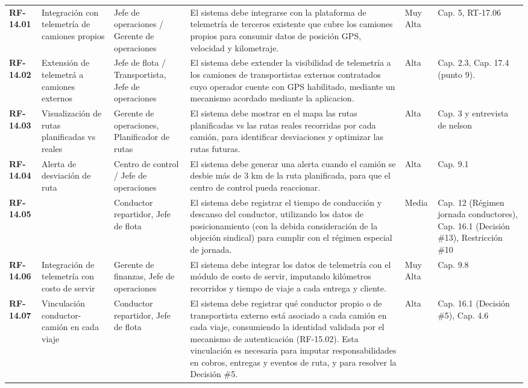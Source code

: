 \begin{longtable}{p{1.7cm} p{2.3cm} p{1.9cm} p{5.0cm} p{1.1cm} p{1.9cm}}
\textbf{RF-14.01} & Integración con telemetría de camiones propios & Jefe de operaciones / Gerente de operaciones & El sistema debe integrarse con la plataforma de telemetría de terceros existente que cubre los camiones propios para consumir datos de posición GPS, velocidad y kilometraje. & Muy Alta & Cap. 5, RT-17.06 \\
\textbf{RF-14.02} & Extensión de telemetrá a camiones externos & Jefe de flota / Transportista, Jefe de operaciones & El sistema debe extender la visibilidad de telemetría a los camiones de transportistas externos contratados cuyo operador cuente con GPS habilitado, mediante un mecanismo acordado mediante la aplicacion. & Alta & Cap. 2.3, Cap. 17.4 (punto 9). \\
\textbf{RF-14.03} & Visualización de rutas planificadas vs reales & Gerente de operaciones, Planificador de rutas & El sistema debe mostrar en el mapa las rutas planificadas vs las rutas reales recorridas por cada camión, para identificar desviaciones y optimizar las rutas futuras. & Alta & Cap. 3 y entrevista de nelson \\
\textbf{RF-14.04} & Alerta de desviación de ruta & Centro de control / Jefe de operaciones & El sistema debe generar una alerta cuando el camión se desbie más de 3 km de la ruta planificada, para que el centro de control pueda reaccionar. & Alta & Cap. 9.1 \\
\textbf{RF-14.05} &  & Conductor repartidor, Jefe de flota & El sistema debe registrar el tiempo de conducción y descanso del conductor, utilizando los datos de posicionamiento (con la debida consideración de la objeción sindical) para cumplir con el régimen especial de jornada. & Media & Cap. 12 (Régimen jornada conductores), Cap. 16.1 (Decisión \#13), Restricción \#10 \\
\textbf{RF-14.06} & Integración de telemetría con costo de servir & Gerente de finanzas, Jefe de operaciones & El sistema debe integrar los datos de telemetría con el módulo de costo de servir, imputando kilómetros recorridos y tiempo de viaje a cada entrega y cliente. & Muy Alta & Cap. 9.8 \\
\textbf{RF-14.07} & Vinculación conductor-camión en cada viaje & Conductor repartidor, Jefe de flota & El sistema debe registrar qué conductor propio o de transportista externo está asociado a cada camión en cada viaje, consumiendo la identidad validada por el mecanismo de autenticación (RF-15.02). Esta vinculación es necesaria para imputar responsabilidades en cobros, entregas y eventos de ruta, y para resolver la Decisión \#5. & Alta & Cap. 16.1 (Decisión \#5), Cap. 4.6 \\

\end{longtable}
